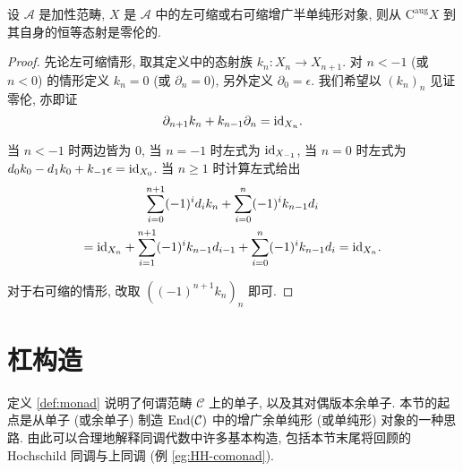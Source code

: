 \begin{proposition}\label{prop:contractible-null-homotopic}
	设 $\mathcal{A}$ 是加性范畴, $X$ 是 $\mathcal{A}$ 中的左可缩或右可缩增广半单纯形对象, 则从 $\mathrm{C}^{\mathrm{aug}} X$ 到其自身的恒等态射是零伦的.
\end{proposition}
\begin{proof}
	先论左可缩情形, 取其定义中的态射族 $k_n: X_n \to X_{n+1}$. 对 $n < -1$ (或 $n < 0$) 的情形定义 $k_n = 0$ (或 $\partial_n = 0$), 另外定义 $\partial_0 = \epsilon$. 我们希望以 $\left(k_n\right)_n$ 见证零伦, 亦即证
	\[ \partial_{n+1} k_n + k_{n-1} \partial_n = \mathrm{id}_{X_n}. \]
	
	当 $n < -1$ 时两边皆为 $0$, 当 $n = -1$ 时左式为 $\mathrm{id}_{X_{-1}}$, 当 $n = 0$ 时左式为 $d_0 k_0 - d_1 k_0 + k_{-1}\epsilon = \mathrm{id}_{X_0}$. 当 $n \geq 1$ 时计算左式给出
	\begin{multline*}
		\sum_{i=0}^{n+1} (-1)^i d_i k_n + \sum_{i=0}^n (-1)^i k_{n-1} d_i \\
		= \mathrm{id}_{X_n} + \sum_{i=1}^{n+1} (-1)^i k_{n-1}d_{i-1} + \sum_{i=0}^n (-1)^i k_{n-1}d_i = \mathrm{id}_{X_n}.
	\end{multline*}
	
	对于右可缩的情形, 改取 $\left((-1)^{n+1} k_n\right)_n$ 即可.
\end{proof}

\section{杠构造}\label{sec:bar-resolution}
定义 \ref{def:monad} 说明了何谓范畴 $\mathcal{C}$ 上的单子, 以及其对偶版本余单子. 本节的起点是从单子 (或余单子) 制造 $\operatorname{End}(\mathcal{C})$ 中的增广余单纯形 (或单纯形) 对象的一种思路. 由此可以合理地解释同调代数中许多基本构造, 包括本节末尾将回顾的 Hochschild 同调与上同调 (例 \ref{eg:HH-comonad}).

